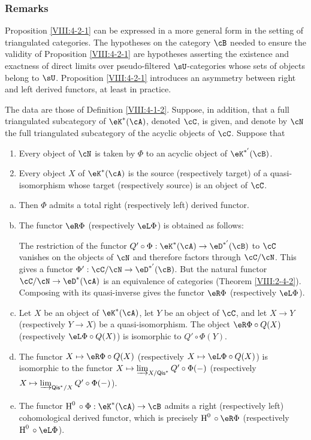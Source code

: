\subsubsection{Remarks}\label{VIII:4-2-2}

Proposition \ref{VIII:4-2-1} can be expressed in a more general form in
the setting of triangulated categories. The hypotheses on the category
$\cB$ needed to ensure the validity of Proposition \ref{VIII:4-2-1} are
hypotheses asserting the existence and exactness of direct limits over
pseudo-filtered $\sU$-categories whose sets of objects belong to $\sU$.
Proposition \ref{VIII:4-2-1} introduces an asymmetry between right and
left derived functors, at least in practice.

\begin{theorem}\label{VIII:4-2-3} %
The data are those of Definition \ref{VIII:4-1-2}. Suppose, in addition,
that a full triangulated subcategory of $\eK^\ast(\cA)$, denoted $\cC$, is given,
and denote by $\cN$ the full triangulated subcategory of the acyclic
objects of $\cC$. Suppose that
\begin{enumerate}[(1)]
  \item Every object of $\cN$ is taken by $\Phi$ to an acyclic object of
    $\eK^{\ast'}(\cB)$.
  \item Every object $X$ of $\eK^\ast(\cA)$ is the source (respectively
    target) of a quasi-isomorphism whose target (respectively source) is
    an object of $\cC$.
\end{enumerate}
\begin{enumerate}[a)]
  \item Then $\Phi$ admits a total right (respectively left) derived
    functor.
  \item The functor $\eR \Phi$ (respectively $\eL \Phi$) is obtained as
    follows:

    The restriction of the functor
    $Q'\circ \Phi:\eK^\ast(\cA) \to \eD^{\ast'}(\cB)$ to $\cC$ vanishes on the
    objects of $\cN$ and therefore factors through $\cC/\cN$. This gives
    a functor $\Phi':\cC/\cN\to \eD^{\ast'}(\cB)$. But the natural
    functor $\cC/\cN\to \eD^\ast(\cA)$ is an equivalence of categories
    (Theorem \ref{VIII:2-4-2}). Composing with its quasi-inverse gives the
    functor $\eR\Phi$ (respectively $\eL \Phi$).
  \item Let $X$ be an object of $\eK^\ast(\cA)$, let $Y$ be an object of
    $\cC$, and let $X\to Y$ (respectively $Y\to X$) be a
    quasi-isomorphism. The object $\eR\Phi\circ Q(X)$ (respectively
    $\eL \Phi\circ Q(X)$) is isomorphic to $Q'\circ \Phi(Y)$.
  \item The functor $X\mapsto \eR\Phi\circ Q(X)$ (respectively
    $X\mapsto \eL \Phi\circ Q(X)$) is isomorphic to the functor
    $X\mapsto \varinjlim_{X/\mathsf{Qis}^\ast} Q'\circ\Phi(-)$
    (respectively
    $X\mapsto \varinjlim_{\mathsf{Qis}^\ast/X} Q'\circ \Phi(-)$).
  \item The functor $\h^0{}\circ \Phi:\eK^\ast(\cA)\to \cB$ admits a
    right (respectively left) cohomological derived functor, which is
    precisely $\h^0{}\circ\eR\Phi$ (respectively
    $\h^0{}\circ \eL\Phi$).
\end{enumerate}
\end{theorem}
